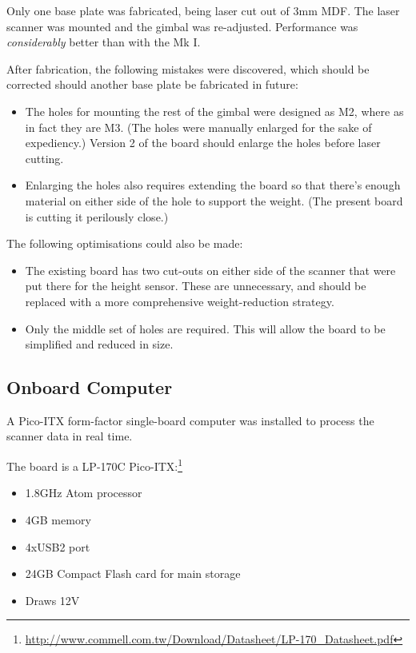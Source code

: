 \documentclass[12pt,oneside,a4paper]{book}
\begin{document}
Only one base plate was fabricated, being laser cut out of 3mm
MDF. The laser scanner was mounted and the gimbal was
re-adjusted. Performance was \emph{considerably} better than with the
Mk I.

After fabrication, the following mistakes were discovered, which
should be corrected should another base plate be fabricated in future:
\begin{itemize}
\item The holes for mounting the rest of the gimbal were designed as
  M2, where as in fact they are M3. (The holes were manually enlarged
  for the sake of expediency.) Version 2 of the board should enlarge
  the holes before laser cutting.
\item Enlarging the holes also requires extending the board so that
  there's enough material on either side of the hole to support the
  weight. (The present board is cutting it perilously close.)
\end{itemize}

The following optimisations could also be made:
\begin{itemize}
\item The existing board has two cut-outs on either side of the
  scanner that were put there for the height sensor. These are
  unnecessary, and should be replaced with a more comprehensive
  weight-reduction strategy.
\item Only the middle set of holes are required. This will allow the
  board to be simplified and reduced in size.
\end{itemize}

\newpage
\subsection{Onboard Computer}
\label{sec:onboard-computer}

A Pico-ITX form-factor single-board computer was installed to process
the scanner data in real time. 

The board is a LP-170C Pico-ITX:\footnote{\url{http://www.commell.com.tw/Download/Datasheet/LP-170_Datasheet.pdf}}
\begin{itemize}
\item 1.8GHz Atom processor
\item 4GB memory
\item 4xUSB2 port
\item 24GB Compact Flash card for main storage
\item Draws 12V
\end{itemize}
\end{document}
